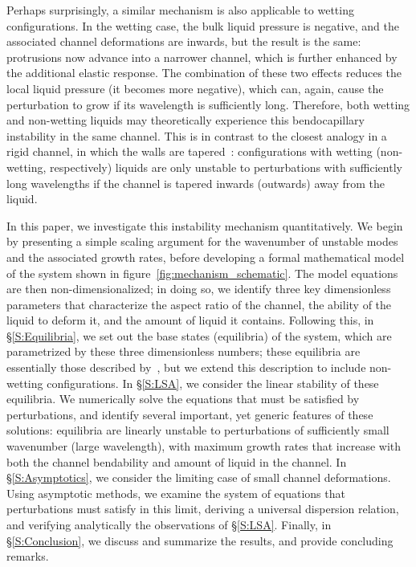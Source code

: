 \documentclass{jfm}
\begin{document}
Perhaps surprisingly, a similar mechanism is also applicable to wetting configurations. In the wetting case, the bulk liquid pressure is negative, and the associated channel deformations are inwards, but the result is the same: protrusions now advance into a narrower channel, which is further enhanced by the additional elastic response. The combination of these two effects reduces the local liquid pressure (it becomes more negative), which can, again, cause the perturbation to grow if its wavelength is sufficiently long. Therefore, both wetting and non-wetting liquids may theoretically experience this bendocapillary instability in the same channel. This is in contrast to the closest analogy in a rigid channel, in which the walls are tapered~\cite{AlHousseiny2012NaturePhysics}: configurations with wetting (non-wetting, respectively) liquids are only unstable to perturbations with sufficiently long wavelengths if the channel is tapered inwards (outwards) away from the liquid.

In this paper, we investigate this instability mechanism quantitatively. We begin by presenting a simple scaling argument for the wavenumber of unstable modes and the associated growth rates, before developing a formal mathematical model of the system shown in figure~\ref{fig:mechanism_schematic}. The model equations are then non-dimensionalized; in doing so, we identify three key dimensionless parameters that characterize the aspect ratio of the channel, the ability of the liquid to deform it, and the amount of liquid it contains. Following this, in \S\ref{S:Equilibria}, we set out the base states (equilibria) of the system, which are parametrized by these three dimensionless numbers; these equilibria are essentially those described by~\citet{Taroni2012JFM}, but we extend this description to include non-wetting configurations. In \S\ref{S:LSA}, we consider the linear stability of these equilibria. We numerically solve the equations that must be satisfied by perturbations, and identify several important, yet generic features of these solutions: equilibria are linearly unstable to perturbations of sufficiently small wavenumber (large wavelength), with maximum growth rates that increase with both the channel bendability and amount of liquid in the channel. In \S\ref{S:Asymptotics}, we consider the limiting case of small channel deformations. Using asymptotic methods, we examine the system of equations that perturbations must satisfy in this limit, deriving a universal dispersion relation, and verifying analytically the observations of \S\ref{S:LSA}. Finally, in \S\ref{S:Conclusion}, we discuss and summarize the results, and provide concluding remarks.
\end{document}
